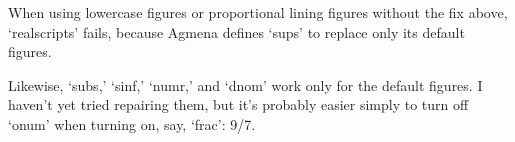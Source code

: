 \documentclass[12pt]{article}
\begin{document}
When using lowercase figures or proportional lining figures without
the fix above, ‘realscripts’ fails, because Agmena defines ‘sups’ to
replace only its default figures.

Likewise, ‘subs,’ ‘sinf,’ ‘numr,’ and ‘dnom’ work only for the default
figures. I haven’t yet tried repairing them, but it’s probably easier
simply to turn off ‘onum’ when turning on, say, ‘frac’:
{9/7}.
\end{document}
